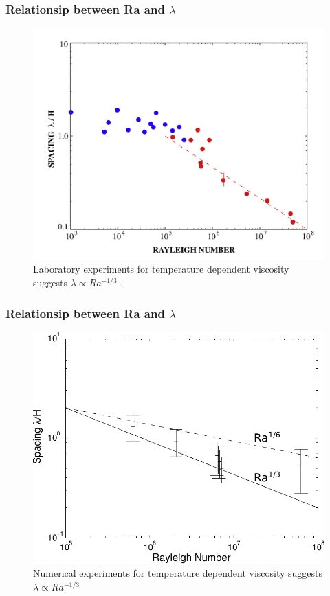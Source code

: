 \documentclass[aspectratio=169]{beamer}
\begin{document}
\begin{frame}
    \frametitle{Relationsip between Ra and $\lambda$}
    \begin{figure}
        \includegraphics[height=0.7\paperheight]{./figures/androvandi-etal-pepi-2011.jpg}
        \caption{Laboratory experiments for temperature dependent viscosity suggests $\lambda \propto Ra^{-1/3}$ \citep{androvandi-etal-2011}.}
    \end{figure}
\end{frame}

\begin{frame}
    \frametitle{Relationsip between Ra and $\lambda$}
    \begin{figure}
        \includegraphics[height=0.7\paperheight]{./figures/RaWave-Stag3D.pdf}
        \caption{Numerical experiments for temperature dependent viscosity suggests $\lambda \propto Ra^{-1/3}$}
    \end{figure}
\end{frame}
\end{document}
